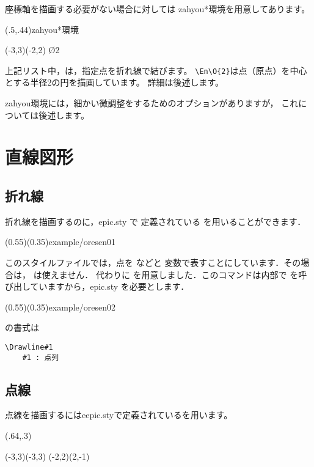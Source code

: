 座標軸を描画する必要がない場合に対しては
\textsf{zahyou*}環境を用意してあります。

\begin{showEx}(.5,.44){\textsf{zahyou*}環境}
\unitlength=8mm
\begin{zahyou*}(-3,3)(-2,2)%
  \Drawline{\LB\RT\RB\LT\LB}
  \En\O{2}%
\end{zahyou*}%
\end{showEx}

上記リスト中，は，指定点を折れ線で結びます。
\verb+\En\O{2}+は点（原点）を中心とする半径2の円を描画しています。
詳細は後述します。

\textsf{zahyou}環境には，細かい微調整をするためのオプションがありますが，
これについては後述します。

\section{直線図形}
\subsection{折れ線}
折れ線を描画するのに，\textsf{epic.sty} で
定義されている  を用いることができます．

(0.55)(0.35){example/oresen01}

このスタイルファイルでは，点を などと
変数で表すことにしています．その場合は， は使えません．
代わりに  を用意しました．このコマンドは内部で
 を呼び出していますから，\textsf{epic.sty} を必要とします．

(0.55)(0.35){example/oresen02}
\bigskip

 の書式は

\begin{boxnote}
\begin{verbatim}
\Drawline#1
    #1 : 点列
\end{verbatim}
\end{boxnote}

\subsection{点線}
点線を描画するには\textsf{eepic.sty}で定義されているを用います。

\begin{showEx}(.64,.3){}
\begin{zahyou}[ul=5mm](-3,3)(-3,3)
  (-2,2)(2,-1)
\end{zahyou}
\end{showEx}

